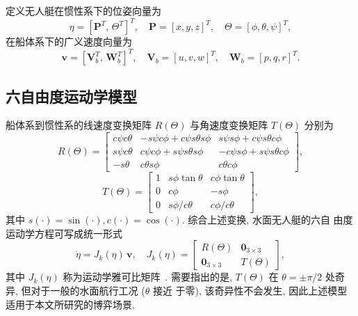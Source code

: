 定义无人艇在惯性系下的位姿向量为
\begin{equation}
\eta = [\mathbf{P}^T,\, \Theta^T]^T,\quad
\mathbf{P} = [x,y,z]^T,\quad
\Theta = [\phi,\theta,\psi]^T,
\label{eq:eta}
\end{equation}
在船体系下的广义速度向量为
\begin{equation}
\bm{v} = [\mathbf{V}_b^T,\, \mathbf{W}_b^T]^T,\quad
\mathbf{V}_b = [u,v,w]^T,\quad
\mathbf{W}_b = [p,q,r]^T.
\label{eq:v_body}
\end{equation}

\subsection{六自由度运动学模型}
\label{subsec:kinematic}
船体系到惯性系的线速度变换矩阵 $R(\Theta)$ 与角速度变换矩阵 $T(\Theta)$ 分别为
\begin{equation}
R(\Theta)=
\begin{bmatrix}
c\psi c\theta & -s\psi c\phi + c\psi s\theta s\phi & s\psi s\phi + c\psi s\theta c\phi \\
s\psi c\theta & c\psi c\phi + s\psi s\theta s\phi & -c\psi s\phi + s\psi s\theta c\phi \\
-s\theta & c\theta s\phi & c\theta c\phi
\end{bmatrix},
\label{eq:R_theta}
\end{equation}
\begin{equation}
T(\Theta)=
\begin{bmatrix}
1 & s\phi \tan\theta & c\phi \tan\theta \\
0 & c\phi & -s\phi \\
0 & s\phi/c\theta & c\phi/c\theta
\end{bmatrix},
\label{eq:T_theta}
\end{equation}
其中 $s(\cdot)=\sin(\cdot), c(\cdot)=\cos(\cdot)$. 综合上述变换, 水面无人艇的六自
由度运动学方程可写成统一形式
\begin{equation}
\dot{\eta} = J_k(\eta)\,\bm{v}, \quad
J_k(\eta)=\begin{bmatrix} R(\Theta) & \mathbf{0}_{3\times3} \\ \mathbf{0}_{3\times3} & T(\Theta) \end{bmatrix},
\label{eq:kinematic}
\end{equation}
其中 $J_k(\eta)$ 称为运动学雅可比矩阵~\cite{fossen2011handbook}. 需要指出的是,
$T(\Theta)$ 在 $\theta=\pm\pi/2$ 处奇异, 但对于一般的水面航行工况 ($\theta$ 接近
于零), 该奇异性不会发生, 因此上述模型适用于本文所研究的博弈场景.

